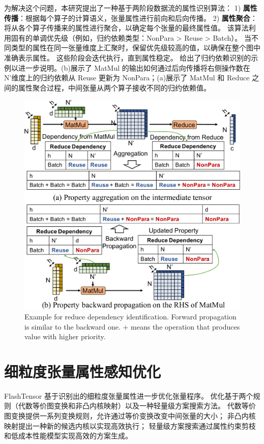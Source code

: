 为解决这个问题，本研究提出了一种基于两阶段数据流的属性识别算法：
1) \textbf{属性传播}：根据每个算子的计算语义，张量属性进行前向和后向传播。
2) \textbf{属性聚合}：将从各个算子传播来的属性进行聚合，以确定每个张量的最终属性值。
该算法利用固有的单调优先级（例如，归约依赖类型：NonPara > Reuse > Batch）。
当不同类型的属性在同一张量维度上汇聚时，保留优先级较高的值，以确保在整个图中准确表示属性。
这些阶段会迭代执行，直到属性稳定。
给出了归约依赖识别的示例以进一步说明。(b)展示了 MatMul 的输出如何通过后向传播将右侧操作数在 N’维度上的归约依赖从 Reuse 更新为 NonPara；(a)展示了 MatMul 和 Reduce 之间的属性聚合过程，中间张量从两个算子接收不同的归约依赖值。

\begin{figure}[h]
    \centering
    \includegraphics[width=\linewidth]{figures/flashtensor/identification_merge-crop.pdf}
    \caption{Example for reduce dependency identification. Forward propagation is similar to the backward one. $+$ means the operation that produces value with higher priority.}
    \label{fig:identification_merge}
\end{figure}

\section{细粒度张量属性感知优化}
FlashTensor 基于识别出的细粒度张量属性进一步优化张量程序。
优化基于两个规则（代数等价图变换和非凸内核映射）以及一种轻量级方案搜索方法。
代数等价图变换提供一系列变换规则，允许通过等价变换改变中间张量的大小；
非凸内核映射提出一种新的候选内核以实现高效执行；
轻量级方案搜索通过属性约束剪枝和低成本性能模型实现高效的方案生成。

